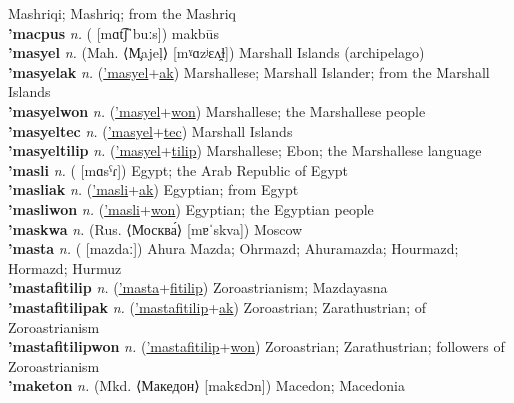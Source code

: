 Mashriqi; Mashriq; from the Mashriq \label{'maclekak} \\
\textbf{'macpus} \textit{n.} ( [mɑt͡ʃˈbuːs])
makbūs \label{'macpus} \\
\textbf{'masyel} \textit{n.} (Mah. ⟨M̧ajeļ⟩ [mˠɑzʲɛʌ̯ɫ])
Marshall Islands (archipelago) \label{'masyel} \\
\textbf{'masyelak} \textit{n.} (\hyperref['masyel]{'masyel}+\hyperref[ak]{ak})
Marshallese; Marshall Islander; from the Marshall Islands \label{'masyelak} \\
\textbf{'masyelwon} \textit{n.} (\hyperref['masyel]{'masyel}+\hyperref[won]{won})
Marshallese; the Marshallese people \label{'masyelwon} \\
\textbf{'masyeltec} \textit{n.} (\hyperref['masyel]{'masyel}+\hyperref[tec]{tec})
Marshall Islands \label{'masyeltec} \\
\textbf{'masyeltilip} \textit{n.} (\hyperref['masyel]{'masyel}+\hyperref[tilip]{tilip})
Marshallese; Ebon; the Marshallese language \label{'masyeltilip} \\
\textbf{'masli} \textit{n.} ( [mɑsˁɾ])
Egypt; the Arab Republic of Egypt \label{'masli} \\
\textbf{'masliak} \textit{n.} (\hyperref['masli]{'masli}+\hyperref[ak]{ak})
Egyptian; from Egypt \label{'masliak} \\
\textbf{'masliwon} \textit{n.} (\hyperref['masli]{'masli}+\hyperref[won]{won})
Egyptian; the Egyptian people \label{'masliwon} \\
\textbf{'maskwa} \textit{n.} (Rus. ⟨Москва́⟩ [mɐˈskva])
Moscow \label{'maskwa} \\
\textbf{'masta} \textit{n.} ( [mazdaː])
Ahura Mazda; Ohrmazd; Ahuramazda; Hourmazd; Hormazd; Hurmuz \label{'masta} \\
\textbf{'mastafitilip} \textit{n.} (\hyperref['masta]{'masta}+\hyperref[fitilip]{fitilip})
Zoroastrianism; Mazdayasna \label{'mastafitilip} \\
\textbf{'mastafitilipak} \textit{n.} (\hyperref['mastafitilip]{'mastafitilip}+\hyperref[ak]{ak})
Zoroastrian; Zarathustrian; of Zoroastrianism \label{'mastafitilipak} \\
\textbf{'mastafitilipwon} \textit{n.} (\hyperref['mastafitilip]{'mastafitilip}+\hyperref[won]{won})
Zoroastrian; Zarathustrian; followers of Zoroastrianism \label{'mastafitilipwon} \\
\textbf{'maketon} \textit{n.} (Mkd. ⟨Македон⟩ [makɛdɔn])
Macedon; Macedonia \label{'maketon} \\

